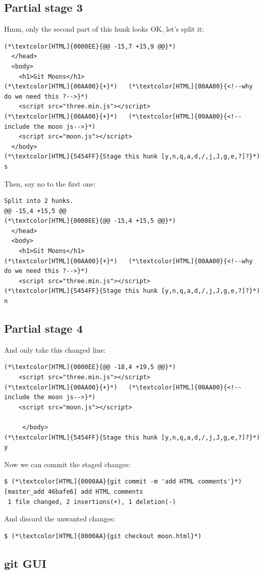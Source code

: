 \subsection{Partial stage 3}
\begin{frame}[fragile]
  \subslidetitle

  Hmm, only the second part of this hunk looks OK, let's split it:
  \begin{lstlisting}
(*\textcolor[HTML]{0000EE}{@@ -15,7 +15,9 @@}*)
  </head>
  <body>
    <h1>Git Moons</h1>
(*\textcolor[HTML]{00AA00}{+}*)   (*\textcolor[HTML]{00AA00}{<!--why do we need this ?-->}*)
    <script src="three.min.js"></script>
(*\textcolor[HTML]{00AA00}{+}*)   (*\textcolor[HTML]{00AA00}{<!--include the moon js-->}*)
    <script src="moon.js"></script>
  </body>
(*\textcolor[HTML]{5454FF}{Stage this hunk [y,n,q,a,d,/,j,J,g,e,?]?}*) s
\end{lstlisting}

  Then, say no to the first one:
  \begin{lstlisting}
Split into 2 hunks.
@@ -15,4 +15,5 @@
(*\textcolor[HTML]{0000EE}{@@ -15,4 +15,5 @@}*)
  </head>
  <body>
    <h1>Git Moons</h1>
(*\textcolor[HTML]{00AA00}{+}*)   (*\textcolor[HTML]{00AA00}{<!--why do we need this ?-->}*)
    <script src="three.min.js"></script>
(*\textcolor[HTML]{5454FF}{Stage this hunk [y,n,q,a,d,/,j,J,g,e,?]?}*) n
\end{lstlisting}
\end{frame}

\subsection{Partial stage 4}
\begin{frame}[fragile]
  \subslidetitle
  And only take this changed line:
  \begin{lstlisting}
(*\textcolor[HTML]{0000EE}{@@ -18,4 +19,5 @@}*)
    <script src="three.min.js"></script>
(*\textcolor[HTML]{00AA00}{+}*)   (*\textcolor[HTML]{00AA00}{<!--include the moon js-->}*)
    <script src="moon.js"></script>

     </body>
(*\textcolor[HTML]{5454FF}{Stage this hunk [y,n,q,a,d,/,j,J,g,e,?]?}*) y
\end{lstlisting}

  Now we can commit the staged changes:
  \begin{lstlisting}
$ (*\textcolor[HTML]{0000AA}{git commit -m 'add HTML comments'}*)
[master_add 46bafe6] add HTML comments
 1 file changed, 2 insertions(+), 1 deletion(-)
\end{lstlisting}

  And discard the unwanted changes:
  \begin{lstlisting}
$ (*\textcolor[HTML]{0000AA}{git checkout moon.html}*)
\end{lstlisting}
\end{frame}

\subsection{git GUI}
\begin{frame}[fragile]
  \subslidetitle
\end{frame}

